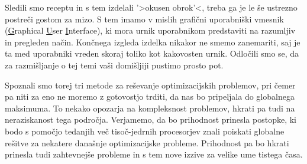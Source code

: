 \documentclass[a4paper, 10pt]{article}
\begin{document}
Sledili smo receptu in s tem izdelali '>okusen obrok'<, treba ga je le še ustrezno postreči
gostom za mizo. S tem imamo v mislih grafični uporabniški vmesnik (\underline{G}raphical
\underline{U}ser \underline{I}nterface), ki mora urnik uporabnikom predstaviti na razumljiv in
pregleden način. Končnega izgleda izdelka nikakor ne smemo zanemariti, saj je ta med uporabniki
vreden skoraj toliko kot kakovosten urnik. Odločili smo se, da za razmišljanje o tej temi vaši
domišljiji pustimo prosto pot.

Spoznali smo torej tri metode za reševanje optimizacijskih problemov, pri čemer pa niti za eno
ne moremo z gotovostjo trditi, da nas bo pripeljala do globalnega maksimuma. To nekako opozarja
na kompleksnost problemov, hkrati pa tudi na neraziskanost tega področja. Verjamemo, da bo
prihodnost prinesla postopke, ki bodo s pomočjo tedanjih več tisoč-jedrnih procesorjev znali
poiskati globalne rešitve za nekatere današnje optimizacijske probleme. Prihodnost pa bo
hkrati prinesla tudi zahtevnejše probleme in s tem nove izzive za velike ume tistega časa.
\end{document}
